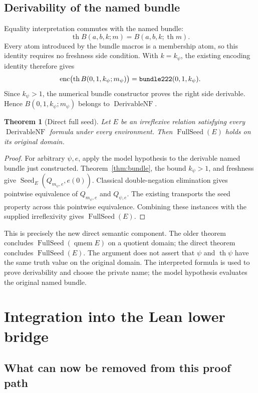 \documentclass[11pt,letterpaper]{article}
\newtheorem{theorem}{Theorem}[section]
\theoremstyle{definition}
\theoremstyle{remark}
\newcommand{\enc}{\operatorname{enc}}
\newcommand{\thh}{\operatorname{th}}
\newcommand{\Seed}{\operatorname{Seed}}
\newcommand{\Der}{\operatorname{DerivableNF}}
\newcommand{\FullSeed}{\operatorname{FullSeed}}
\newcommand{\code}[1]{\texttt{\detokenize{#1}}}
\begin{document}
\subsection{Derivability of the named bundle}

Equality interpretation commutes with the named bundle:
\[
  \thh B(a,b,k;m)=B(a,b,k;\thh m).
\]
Every atom introduced by the bundle macros is a membership atom, so this identity
requires no freshness side condition. With \(k=k_\psi\), the existing encoding
identity therefore gives
\[
 \enc\bigl(\thh B(0,1,k_\psi;m_\psi)\bigr)
   =\code{bundle222}(0,1,k_\psi).
\]
Since \(k_\psi>1\), the numerical bundle constructor proves the right side
derivable. Hence \(B(0,1,k_\psi;m_\psi)\) belongs to \(\Der\).

\begin{theorem}[Direct full seed]\label{thm:direct}
Let \(E\) be an irreflexive relation satisfying every \(\Der\) formula under
every environment. Then \(\FullSeed(E)\) holds on its original domain.
\end{theorem}
\begin{proof}
For arbitrary \(\psi,e\), apply the model hypothesis to the derivable named
bundle just constructed. Theorem~\ref{thm:bundle}, the bound \(k_\psi>1\), and
freshness give \(\Seed_E(Q_{m_\psi,e},e(0))\). Classical double-negation
elimination gives pointwise equivalence of \(Q_{m_\psi,e}\) and
\(Q_{\psi,e}\). The existing \code{seedProp_congr} transports the seed property
across this pointwise equivalence. Combining these instances with the supplied
irreflexivity gives \(\FullSeed(E)\).
\end{proof}

This is precisely the new direct semantic component. The older theorem concludes
\(\FullSeed(\operatorname{qmem}E)\) on a quotient domain; the direct theorem
concludes \(\FullSeed(E)\).
The argument does not assert that \(\psi\) and \(\thh\psi\) have the same
truth value on the original domain. The interpreted formula is used to prove
derivability and choose the private name; the model hypothesis evaluates the
original named bundle.

\section{Integration into the Lean lower bridge}

\subsection{What can now be removed from this proof path}
\end{document}
